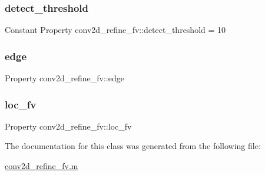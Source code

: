\subsubsection{\texorpdfstring{detect\+\_\+threshold}{detect\_threshold}}
{\footnotesize\ttfamily Constant Property conv2d\+\_\+refine\+\_\+fv\+::detect\+\_\+threshold = 10}

\mbox{\label{classconv2d__refine__fv_a4a636a19651dbaae917c8207eb700ccf}} 
\subsubsection{\texorpdfstring{edge}{edge}}
{\footnotesize\ttfamily Property conv2d\+\_\+refine\+\_\+fv\+::edge}

\mbox{\label{classconv2d__refine__fv_aa9c4693b06c9d163795ee7ce22ee87b9}} 
\subsubsection{\texorpdfstring{loc\+\_\+fv}{loc\_fv}}
{\footnotesize\ttfamily Property conv2d\+\_\+refine\+\_\+fv\+::loc\+\_\+fv}



The documentation for this class was generated from the following file\+:\begin{DoxyCompactItemize}
\item 
\hyperlink{conv2d__refine__fv_8m}{conv2d\+\_\+refine\+\_\+fv.\+m}\end{DoxyCompactItemize}
